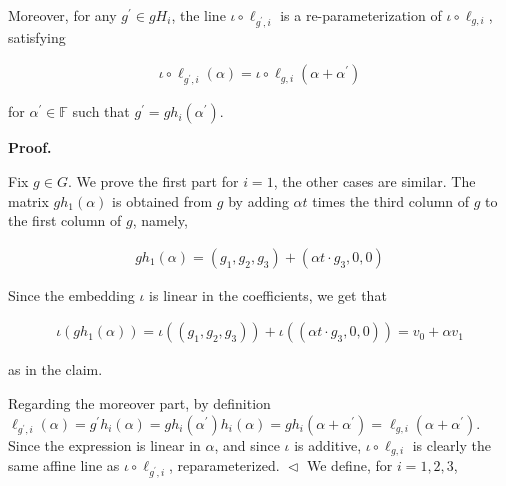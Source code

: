 Moreover, for any $g^{\prime}\in gH_{i}$, the line $\iota\circ\ell_{g^{\prime},i}$ is a re-parameterization of $\iota\circ\ell_{g,i}$, satisfying\par


\[\begin{gathered}
\iota\circ\ell_{g^{\prime},i}(\alpha)=\iota\circ\ell_{g,i}(\alpha+\alpha^{\prime})
\end{gathered}\]


for $\alpha^{\prime}\in\mathbb{F}$ such that $g^{\prime}=gh_{i}(\alpha^{\prime})$.\par






\par\medskip\noindent\textbf{
\textbf{Proof}.}\par




Fix $g\in G$. We prove the first part for $i=1$, the other cases are similar. The matrix $gh_{1}(\alpha)$ is obtained from $g$ by adding $\alpha t$ times the third column of $g$ to the first column of $g$, namely,\par


\[\begin{gathered}
gh_{1}(\alpha)=(g_{1},g_{2},g_{3})+(\alpha t\cdot g_{3},0,0)
\end{gathered}\]


Since the embedding $\iota$ is linear in the coefficients, we get that\par


\[\begin{gathered}
\iota(gh_{1}(\alpha))=\iota((g_{1},g_{2},g_{3}))+\iota((\alpha t\cdot g_{3},0,0))=v_{0}+\alpha v_{1}
\end{gathered}\]


as in the claim.\par




Regarding the moreover part, by definition $\ell_{g^{\prime},i}(\alpha)=g^{\prime}h_{i}(\alpha)=gh_{i}(\alpha^{\prime})h_{i}(\alpha)=gh_{i}(\alpha+\alpha^{\prime})=\ell_{g,i}(\alpha+\alpha^{\prime})$. Since the expression is linear in $\alpha$, and since $\iota$ is additive, $\iota\circ\ell_{g,i}$ is clearly the same affine line as $\iota\circ\ell_{g^{\prime},i}$, reparameterized.
$\vartriangleleft$
We define, for $i=1,2,3$,\par



